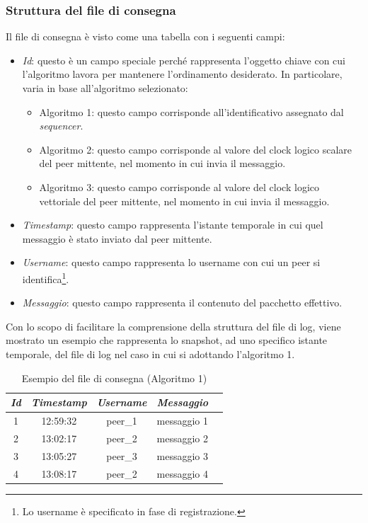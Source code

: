 \documentclass[acmtog]{acmart}
\begin{document}
\subsubsection{Struttura del file di consegna} Il file di consegna è visto come una tabella con i seguenti campi:
\begin{itemize}
\item \textit{Id}: questo è un campo speciale perché rappresenta l'oggetto chiave con cui l'algoritmo lavora per mantenere l'ordinamento desiderato. In particolare, varia in base all'algoritmo selezionato:
\begin{itemize}
\item Algoritmo 1: questo campo corrisponde all'identificativo assegnato dal \textit{sequencer}.
\item Algoritmo 2: questo campo corrisponde al valore del clock logico scalare del peer mittente, nel momento in cui invia il messaggio.
\item Algoritmo 3: questo campo corrisponde al valore del clock logico vettoriale del peer mittente, nel momento in cui invia il messaggio.
\end{itemize}
\item \textit{Timestamp}: questo campo rappresenta l'istante temporale in cui quel messaggio è stato inviato dal peer mittente.
\item \textit{Username}: questo campo rappresenta lo username con cui un peer si identifica\footnote{Lo username è specificato in fase di registrazione.}.
\item \textit{Messaggio}: questo campo rappresenta il contenuto del pacchetto effettivo.
\end{itemize}

Con lo scopo di facilitare la comprensione della struttura del file di log, viene mostrato un esempio che rappresenta lo snapshot, ad uno specifico istante temporale, del file di log nel caso in cui si adottando l'algoritmo 1.

\begin{table}[ht!]
  \caption{Esempio del file di consegna (Algoritmo 1)}
  \label{tab:file}
  \begin{tabular}{ccccl}
    \toprule
    \textit{Id} & \textit{Timestamp} & \textit{Username} & \textit{Messaggio} \\
    \midrule
    1 & 12:59:32 & peer\_1 & messaggio 1 \\
    2 & 13:02:17 & peer\_2 & messaggio 2 \\
    3 & 13:05:27 & peer\_3 & messaggio 3 \\
    4 & 13:08:17 & peer\_2 & messaggio 4 \\
  \bottomrule
\end{tabular}
\end{table}
\end{document}

